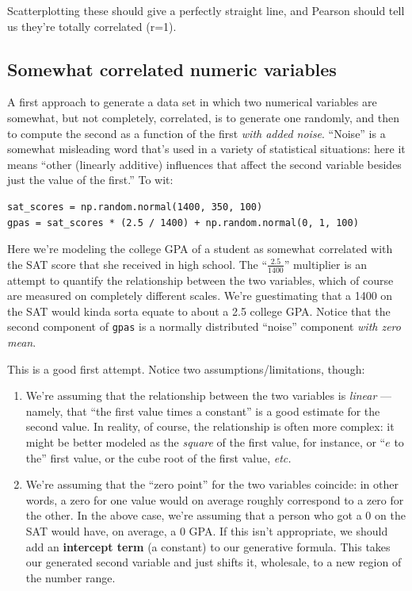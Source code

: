 Scatterplotting these should give a perfectly straight line, and Pearson
should tell us they're totally correlated (r=1).

\subsection{Somewhat correlated numeric variables}

A first approach to generate a data set in which two numerical variables
are somewhat, but not completely, correlated, is to generate one randomly, and
then to compute the second as a function of the first \textit{with added
noise}. ``Noise'' is a somewhat misleading word that's used in a variety of
statistical situations: here it means ``other (linearly additive) influences
that affect the second variable besides just the value of the first.'' To wit:

\begin{Verbatim}[fontsize=\small,samepage=true,frame=single]
sat_scores = np.random.normal(1400, 350, 100)
gpas = sat_scores * (2.5 / 1400) + np.random.normal(0, 1, 100)
\end{Verbatim}

Here we're modeling the college GPA of a student as somewhat correlated with
the SAT score that she received in high school. The ``$\frac{2.5}{1400}$''
multiplier is an attempt to quantify the relationship between the two
variables, which of course are measured on completely different scales. We're
guestimating that a 1400 on the SAT would kinda sorta equate to about a 2.5
college GPA. Notice that the second component of \texttt{gpas} is a normally
distributed ``noise'' component \textit{with zero mean}. 

This is a good first attempt. Notice two assumptions/limitations, though:

\begin{enumerate}
\item We're assuming that the relationship between the two variables is
\textit{linear} --- namely, that ``the first value times a constant'' is a good
estimate for the second value. In reality, of course, the relationship is
often more complex: it might be better modeled as the \textit{square} of the
first value, for instance, or ``$e$ to the'' first value, or the cube root of
the first value, \textit{etc.}
\item We're assuming that the ``zero point'' for the two variables coincide:
in other words, a zero for one value would on average roughly correspond to a
zero for the other. In the above case, we're assuming that a person who got a
0 on the SAT would have, on average, a 0 GPA. If this isn't appropriate, we
should add an \textbf{intercept term} (a constant) to our generative formula.
This takes our generated second variable and just shifts it, wholesale, to a
new region of the number range.
\end{enumerate}

